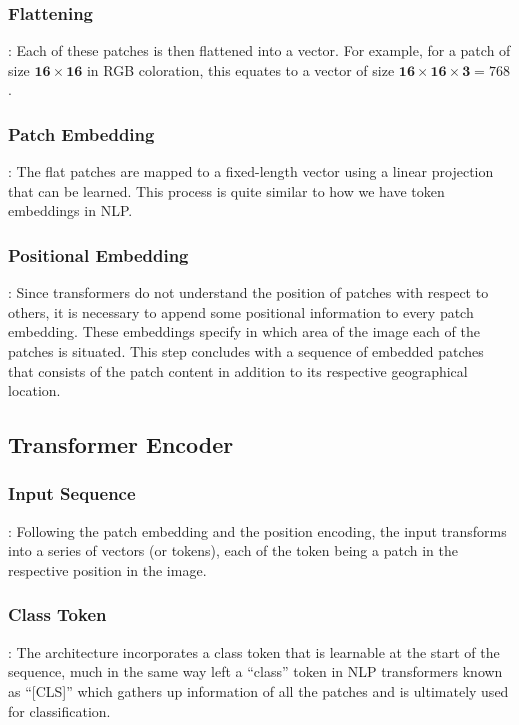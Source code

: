 \subsubsection{Flattening}: Each of these patches is then flattened into a vector. For example, for a patch of size $\mathbf{16}\times\mathbf{16}$ in RGB coloration, this equates to a vector of size $\mathbf{16}\times\mathbf{16} \times\mathbf{3}=768$.
\subsubsection{Patch Embedding}: The flat patches are mapped to a fixed-length vector using a linear projection that can be learned. This process is quite similar to how we have token embeddings in NLP.
\subsubsection{Positional Embedding}: Since transformers do not understand the position of patches with respect to others, it is necessary to append some positional information to every patch embedding. These embeddings specify in which area of the image each of the patches is situated.
This step concludes with a sequence of embedded patches that consists of the patch content in addition to its respective geographical location.
\subsection{Transformer Encoder}
\subsubsection{Input Sequence}: Following the patch embedding and the position encoding, the input transforms into a series of vectors (or tokens), each of the token being a patch in the respective position in the image.
\subsubsection{Class Token}: The architecture incorporates a class token that is learnable at the start of the sequence, much in the same way left a “class” token in NLP transformers known as “[CLS]” which gathers up information of all the patches and is ultimately used for classification.
